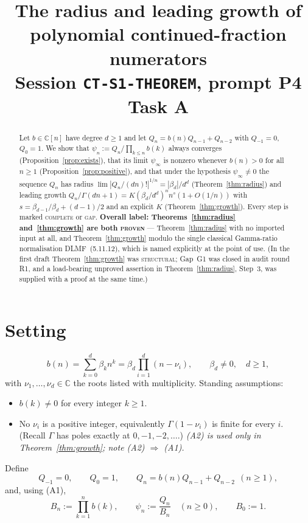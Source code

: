 \documentclass[11pt]{article}
\title{The radius and leading growth of polynomial continued-fraction
numerators\\[4pt]
\large Session \texttt{CT-S1-THEOREM}, prompt P4 Task A}
\author{}
\date{}
\theoremstyle{definition}
\newcommand{\bd}{\beta_d}
\newcommand{\bdm}{\beta_{d-1}}
\newcommand{\psiinf}{\psi_\infty}
\newcommand{\C}{\mathbb{C}}
\begin{document}
\maketitle

\begin{abstract}
Let $b\in\C[n]$ have degree $d\ge 1$ and let $Q_n=b(n)Q_{n-1}+Q_{n-2}$ with
$Q_{-1}=0$, $Q_0=1$. We show that $\psi_n:=Q_n/\prod_{k\le n}b(k)$ always
converges (Proposition~\ref{prop:exists}), that its limit $\psiinf$ is nonzero
whenever $b(n)>0$ for all $n\ge1$ (Proposition~\ref{prop:positive}), and that
under the hypothesis $\psiinf\neq0$ the sequence $Q_n$ has radius
$\lim|Q_n/(dn)!|^{1/n}=|\bd|/d^d$ (Theorem~\ref{thm:radius}) and leading growth
$Q_n/\Gamma(dn+1)=K(\bd/d^d)^n n^s(1+O(1/n))$ with
$s=\bdm/\bd+(d-1)/2$ and an explicit $K$ (Theorem~\ref{thm:growth}).
Every step is marked \textsc{complete} or \textsc{gap}.
\textbf{Overall label: Theorems~\ref{thm:radius} and~\ref{thm:growth} are both
\textsc{proven}} --- Theorem~\ref{thm:radius} with no imported input at all, and
Theorem~\ref{thm:growth} modulo the single classical Gamma-ratio normalisation
DLMF~(5.11.12), which is named explicitly at the point of
use. (In the first draft Theorem~\ref{thm:growth} was \textsc{structural}; Gap~G1
was closed in audit round R1, and a load-bearing unproved assertion in
Theorem~\ref{thm:radius}, Step~3, was supplied with a proof at the same time.)
\end{abstract}

\section{Setting}

\begin{equation}\label{eq:setting}
b(n)=\sum_{k=0}^{d}\beta_k n^k=\bd\prod_{i=1}^{d}(n-\nu_i),
\qquad \bd\neq0,\quad d\ge1,
\end{equation}
with $\nu_1,\dots,\nu_d\in\C$ the roots listed with multiplicity. Standing
assumptions:
\begin{itemize}
\item[\textbf{(A1)}] $b(k)\neq0$ for every integer $k\ge1$.
\item[\textbf{(A2)}] No $\nu_i$ is a positive integer, equivalently
$\Gamma(1-\nu_i)$ is finite for every $i$. (Recall $\Gamma$ has poles exactly at
$0,-1,-2,\dots$.) \emph{(A2) is used only in Theorem~\ref{thm:growth}; note
(A2) $\Rightarrow$ (A1).}
\end{itemize}
Define
\begin{equation}\label{eq:rec}
Q_{-1}=0,\qquad Q_0=1,\qquad Q_n=b(n)Q_{n-1}+Q_{n-2}\ \ (n\ge1),
\end{equation}
and, using (A1),
\begin{equation}\label{eq:rn}
B_n:=\prod_{k=1}^{n}b(k),\qquad \psi_n:=\frac{Q_n}{B_n}\quad(n\ge0),\qquad B_0:=1 .
\end{equation}
\end{document}
